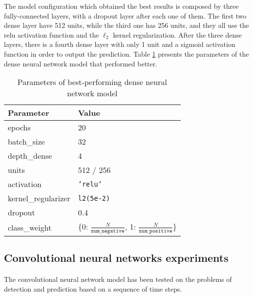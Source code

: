 The model configuration which obtained the best results is composed by three fully-connected layers, with a dropout layer after each one of them. The first two dense layer have 512 units, while the third one has 256 units, and they all use the \acs{relu} activation function and the $\ell_2$ kernel regularization. After the three dense layers, there is a fourth dense layer with only 1 unit and a sigmoid activation function in order to output the prediction. Table \ref{tab:dense_param} presents the parameters of the dense neural network model that performed better.
\begin{table}[htbp]
    \centering
    \begin{tabular}{ll}
        \hline
        \textbf{Parameter}  & \textbf{Value} \\\hline
        epochs              & 20 \\
        batch\_size         & 32 \\
        depth\_dense        & 4 \\
        units               & 512 / 256 \\
        activation          & \texttt{'relu'} \\
        kernel\_regularizer & \texttt{l2(5e-2)} \\
        dropout             & 0.4 \\
        class\_weight       & \{0: $\frac{N}{\texttt{num\_negative}}$, 1: $\frac{N}{\texttt{num\_positive}}$\} \\\hline
    \end{tabular}
    \caption{Parameters of best-performing dense neural network model}
    \label{tab:dense_param}
\end{table}

\subsection{Convolutional neural networks experiments}
\paragraph{} The convolutional neural network model has been tested on the problems of detection and prediction based on a sequence of time steps.

